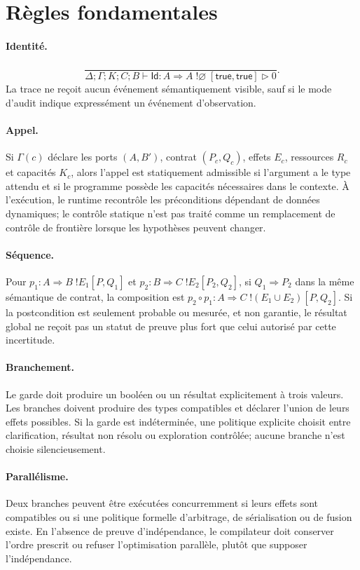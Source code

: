 \documentclass[11pt,a4paper,openany]{book}
\theoremstyle{definition}
\theoremstyle{plain}
\theoremstyle{remark}
\begin{document}
\section{Règles fondamentales}
\paragraph{Identité.}
\[
\frac{}{\Delta;\Gamma;K;C;B\vdash\mathsf{Id}:A\Rightarrow A\;!\varnothing\;[\mathsf{true},\mathsf{true}]\triangleright 0}.
\]
La trace ne reçoit aucun événement sémantiquement visible, sauf si le mode d'audit indique expressément un événement d'observation.

\paragraph{Appel.} Si $\Gamma(c)$ déclare les ports $(A,B')$, contrat $(P_c,Q_c)$, effets $E_c$, ressources $R_c$ et capacités $K_c$, alors l'appel est statiquement admissible si l'argument a le type attendu et si le programme possède les capacités nécessaires dans le contexte. À l'exécution, le runtime recontrôle les préconditions dépendant de données dynamiques; le contrôle statique n'est pas traité comme un remplacement de contrôle de frontière lorsque les hypothèses peuvent changer.

\paragraph{Séquence.} Pour $p_1:A\Rightarrow B\;!E_1[P,Q_1]$ et $p_2:B\Rightarrow C\;!E_2[P_2,Q_2]$, si $Q_1\Rightarrow P_2$ dans la même sémantique de contrat, la composition est $p_2\circ p_1:A\Rightarrow C\;!(E_1\cup E_2)[P,Q_2]$. Si la postcondition est seulement probable ou mesurée, et non garantie, le résultat global ne reçoit pas un statut de preuve plus fort que celui autorisé par cette incertitude.

\paragraph{Branchement.} Le garde doit produire un booléen ou un résultat explicitement à trois valeurs. Les branches doivent produire des types compatibles et déclarer l'union de leurs effets possibles. Si la garde est indéterminée, une politique explicite choisit entre clarification, résultat non résolu ou exploration contrôlée; aucune branche n'est choisie silencieusement.

\paragraph{Parallélisme.} Deux branches peuvent être exécutées concurremment si leurs effets sont compatibles ou si une politique formelle d'arbitrage, de sérialisation ou de fusion existe. En l'absence de preuve d'indépendance, le compilateur doit conserver l'ordre prescrit ou refuser l'optimisation parallèle, plutôt que supposer l'indépendance.
\end{document}
